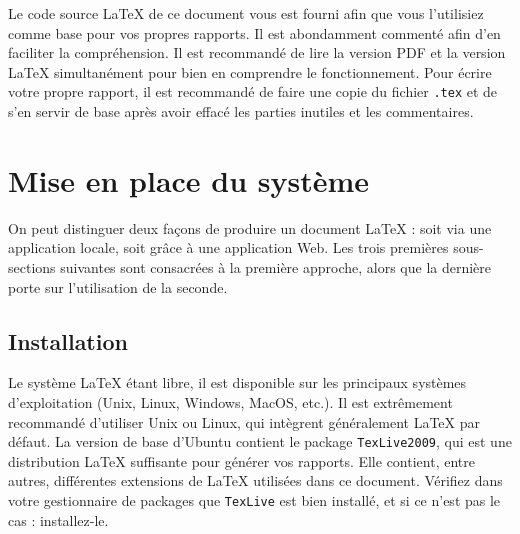 \documentclass{ceri}
\begin{document}
Le code source \LaTeX{} de ce document vous est fourni afin que vous l'utilisiez comme base pour vos propres rapports. Il est abondamment commenté afin d'en faciliter la compréhension. Il est recommandé de lire la version PDF et la version \LaTeX{} simultanément pour bien en comprendre le fonctionnement. Pour écrire votre propre rapport, il est recommandé de faire une copie du fichier \texttt{.tex} et de s'en servir de base après avoir effacé les parties inutiles et les commentaires.


\section{Mise en place du système}
On peut distinguer deux façons de produire un document \LaTeX{} : soit via une application locale, soit grâce à une application Web. Les trois premières sous-sections suivantes sont consacrées à la première approche, alors que la dernière porte sur l'utilisation de la seconde.

\subsection{Installation}
\label{sec:installation}
Le système \LaTeX{} étant libre, il est disponible sur les principaux systèmes d'exploitation (Unix, Linux, Windows, MacOS, etc\@.). Il est extrêmement recommandé d'utiliser Unix ou Linux, qui intègrent généralement \LaTeX{} par défaut.
La version de base d'Ubuntu contient le package \texttt{TexLive2009}, qui est une distribution \LaTeX{} suffisante pour générer vos rapports. Elle contient, entre autres, différentes extensions de \LaTeX{} utilisées dans ce document. Vérifiez dans votre gestionnaire de packages que \texttt{TexLive} est bien installé, et si ce n'est pas le cas : installez-le.
\end{document}
